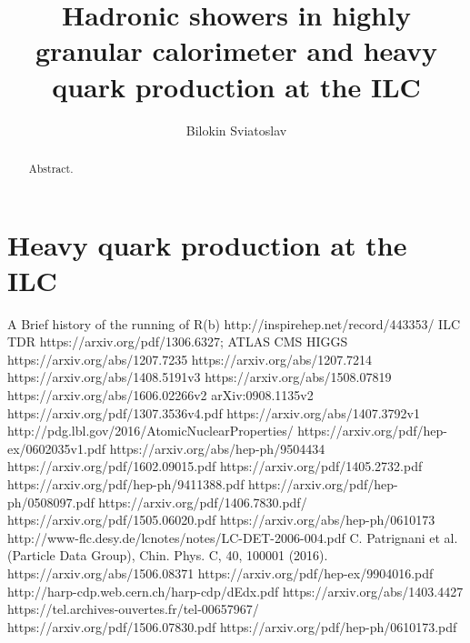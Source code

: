 \documentclass[a4paper]{article}
\title{Hadronic showers in highly granular calorimeter and heavy quark production at the ILC}
\author{Bilokin Sviatoslav}
\begin{document}
\maketitle
\begin{abstract}
Abstract.
\end{abstract}
\tableofcontents
\linenumbers
%
%

\newpage
%
\newpage
\part{Heavy quark production at the ILC}


% 
\begin{thebibliography}{100} 
 A Brief history of the running of R(b) http://inspirehep.net/record/443353/
 ILC TDR https://arxiv.org/pdf/1306.6327;
 ATLAS CMS HIGGS 
https://arxiv.org/abs/1207.7235
 https://arxiv.org/abs/1207.7214
  https://arxiv.org/abs/1408.5191v3
 https://arxiv.org/abs/1508.07819
 https://arxiv.org/abs/1606.02266v2
  arXiv:0908.1135v2
 https://arxiv.org/pdf/1307.3536v4.pdf
 https://arxiv.org/abs/1407.3792v1
 http://pdg.lbl.gov/2016/AtomicNuclearProperties/
 https://arxiv.org/pdf/hep-ex/0602035v1.pdf
 https://arxiv.org/abs/hep-ph/9504434
 https://arxiv.org/pdf/1602.09015.pdf
 https://arxiv.org/pdf/1405.2732.pdf
 https://arxiv.org/pdf/hep-ph/9411388.pdf
https://arxiv.org/pdf/hep-ph/0508097.pdf
 https://arxiv.org/pdf/1406.7830.pdf/
https://arxiv.org/pdf/1505.06020.pdf
https://arxiv.org/abs/hep-ph/0610173
http://www-flc.desy.de/lcnotes/notes/LC-DET-2006-004.pdf
C. Patrignani et al. (Particle Data Group), Chin. Phys. C, 40, 100001 (2016).
 https://arxiv.org/abs/1506.08371
 https://arxiv.org/pdf/hep-ex/9904016.pdf
 http://harp-cdp.web.cern.ch/harp-cdp/dEdx.pdf
 https://arxiv.org/abs/1403.4427
 https://tel.archives-ouvertes.fr/tel-00657967/
https://arxiv.org/pdf/1506.07830.pdf
https://arxiv.org/pdf/hep-ph/0610173.pdf
\end{thebibliography}
\end{document}
